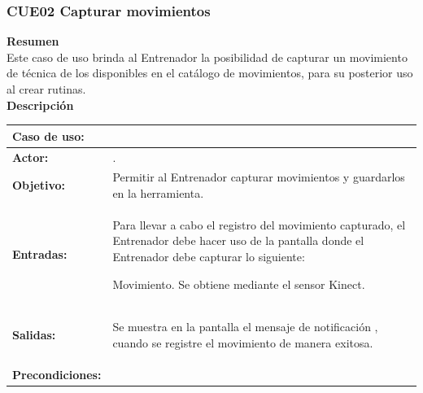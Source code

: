 \subsubsection{CUE02 Capturar movimientos}
\label{cu:CUE02}

\textbf{\textcolor[rgb]{0, 0, 0.545098}{Resumen}} \\

Este caso de uso brinda al Entrenador la posibilidad de capturar un movimiento de técnica de los disponibles en el catálogo de movimientos, para su posterior uso al crear rutinas.\\

\textbf{\textcolor[rgb]{0, 0, 0.545098}{Descripción}}

\begin{table}[H]
\centering
\begin{tabular}{| l | p{12 cm} |}
\hline
\rowcolor[rgb]{0.529412, 0.807843, 0.980392} {\textbf{Caso de uso:}} & \hspace{7em}{\textbf{CUE02 Capturar movimientos}}\\
\hline
\textbf{Actor:} &  \nameref{act:Entrenador}. \\
\hline
\textbf{Objetivo:} & Permitir al Entrenador capturar movimientos y guardarlos en la herramienta.\\
\hline
\textbf{Entradas:} & Para llevar a cabo el registro del movimiento capturado, el Entrenador debe hacer uso de la pantalla \nameref{pant:IUE02} donde el Entrenador debe capturar lo siguiente:
		\begin{compactitem} 
			\setlength\itemsep{-0.25em}
			\item Movimiento. Se obtiene mediante el sensor Kinect.
		\end{compactitem} \\
\hline
\textbf{Salidas:} & \vspace{-2mm}	%
					\begin{compactitem}
						\setlength\itemsep{-0.25em}
						\item Se muestra en la pantalla \nameref{pant:IUE02} el mensaje de notificación \nameref{msj:MSG01},  cuando se registre el movimiento de manera exitosa.
					\end{compactitem}\\
\hline
\textbf{Precondiciones:} & 	\vspace{-2mm}	%
							\begin{compactitem}
								\setlength\itemsep{-0.25em}

\end{compactitem}
\end{tabular}
\end{table}
